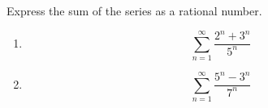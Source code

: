 Express the sum of the series as a rational number.
\begin{multicols}{2}
\begin{enumerate}
\item 
\label{problemSum(2^n+3^n)/(5^n)}
\[
\sum\limits_{n=1}^{\infty} \frac{2^n+3^n}{5^n}
\]


\item \label{problemSum(3^n+5^n)/(7^n)}
\[
\sum\limits_{n=1}^{\infty} \frac{5^n-3^n}{7^n}
\]

\end{enumerate}
\end{multicols}